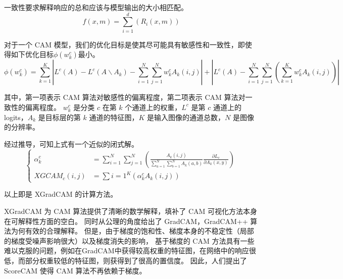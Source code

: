 \documentclass[supercite]{Experimental_Report}
\theoremstyle{definition}
\begin{document}
一致性要求解释响应的总和应该与模型输出的大小相匹配。
\begin{equation}
	f(x,m)=\sum_{i=1}^{d}(R_i(x,m))
\end{equation}

对于一个 CAM 模型，我们的优化目标是使其尽可能具有敏感性和一致性，即使得如下优化目标$\phi(w_k^c)$最小。
\begin{equation}
	\phi(w_k^c)=\sum_{k=1}^{K}|L^c(A)-L^c(A\backslash A_k)-\sum_{i=1}^{N}\sum_{j=1}^{N}w_k^cA_k(i,j)|+|L^c(A)-\sum_{i=1}^{N}\sum_{j=1}^{N}(\sum_{k=1}^{K}w_k^cA_k(i,j))|
\end{equation}

其中，第一项表示 CAM 算法对敏感性的偏离程度，第二项表示 CAM 算法对一致性的偏离程度。
$w_k^c$ 是分类 $c$ 在第 $k$ 个通道上的权重，$L^c$ 是第 $c$ 通道上的 logits，$A_k$ 是目标层的第 $k$ 通道的特征图，$K$ 是输入图像的通道总数，$N$ 是图像的分辨率。

经过推导，可知上式有一个近似的闭式解。
\begin{equation}
	\left\{
		\begin{aligned}
			\alpha_k^c&=\sum_{i=1}^{N}\sum_{j=1}^{N}(\frac{A_k(i,j)}{\sum_{a=1}^{N}\sum_{b=1}^{N}A_k(a,b)}\frac{\partial L_c}{\partial A_k(x,y)})\\
			XGCAM_c(i,j)&=\sum{i=1}^{K}(\alpha_k^cA_k(i,j))
		\end{aligned}
	\right.
\end{equation}

以上即是 XGradCAM 的计算方法。

XGradCAM 为 CAM 算法提供了清晰的数学解释，填补了 CAM 可视化方法本身在可解释性方面的空白。
同时从公理的角度给出了 GradCAM，GradCAM++ 算法为何有效的合理解释。
但是，由于梯度的饱和性、梯度本身的不稳定性（局部的梯度受噪声影响很大）以及梯度消失的影响，
基于梯度的 CAM 方法具有一些难以克服的问题，例如在GradCAM中获得较高权重的特征图，在网络中的响应很低，而部分权重较低的特征图，则获得到了很高的置信度。
因此，人们提出了 ScoreCAM 使得 CAM 算法不再依赖于梯度。
\end{document}
